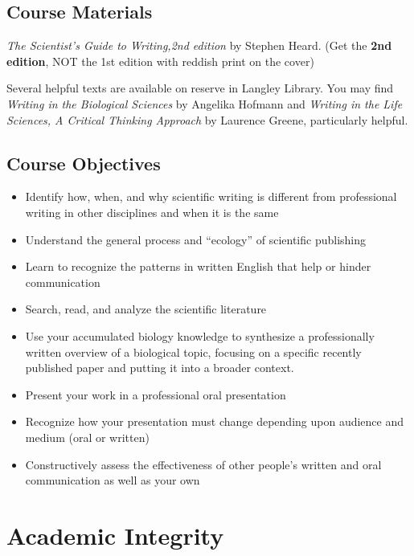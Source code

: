 \documentclass[
]{book}
\providecommand{\tightlist}{%
  \setlength{\itemsep}{0pt}\setlength{\parskip}{0pt}}
\begin{document}
\hypertarget{course-materials}{%
\section{Course Materials}\label{course-materials}}

\emph{The Scientist's Guide to Writing,2nd edition} by Stephen Heard. (Get the \textbf{2nd edition}, NOT the 1st edition with reddish print on the cover)

Several helpful texts are available on reserve in Langley Library. You may find \emph{Writing in the Biological Sciences} by Angelika Hofmann and \emph{Writing in the Life Sciences, A Critical Thinking Approach} by Laurence Greene, particularly helpful.

\hypertarget{objectives}{%
\section{Course Objectives}\label{objectives}}

\begin{itemize}
\tightlist
\item
  Identify how, when, and why scientific writing is different from professional writing in other disciplines and when it is the same
\item
  Understand the general process and ``ecology'' of scientific publishing
\item
  Learn to recognize the patterns in written English that help or hinder communication
\item
  Search, read, and analyze the scientific literature
\item
  Use your accumulated biology knowledge to synthesize a professionally written overview of a biological topic, focusing on a specific recently published paper and putting it into a broader context.
\item
  Present your work in a professional oral presentation
\item
  Recognize how your presentation must change depending upon audience and medium (oral or written)
\item
  Constructively assess the effectiveness of other people's written and oral communication as well as your own
\end{itemize}

\hypertarget{academic-integrity}{%
\chapter{Academic Integrity}\label{academic-integrity}}
\end{document}
